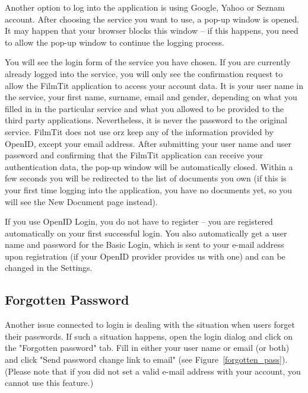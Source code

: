 Another option to log into the application is using Google, Yahoo or Seznam account. After choosing the service you want to use, a pop-up window is opened. It may happen that your browser blocks this window -- if this happens, you need to allow the pop-up window to continue the logging process.

You will see the login form of the service you have chosen. If you are currently already logged into the service, you will only see the confirmation request to allow the FilmTit application to access your account data. It is your user name in the service, your first name, surname, email and gender, depending on what you filled in in the particular service and what you allowed to be provided to the third party applications. Nevertheless, it is never the password to the original service. FilmTit does not use orz keep any of the information provided by OpenID, except your email address.
After submitting your user name and user password and confirming that the FilmTit application can receive your authentication data, the pop-up window will be automatically closed. Within a few seconds you will be redirected to the list of documents you own (if this is your first time logging into the application, you have no documents yet, so you will see the New Document page instead).

If you use OpenID Login, you do not have to register -- you are registered automatically on your first successful login. You also automatically get a user name and password for the Basic Login, which is sent to your e-mail address upon registration (if your OpenID provider provides us with one) and can be changed in the Settings.

\subsection{Forgotten Password}

Another issue connected to login is dealing with the situation when users forget their passwords. If such a situation happens, open the login dialog and click on the "Forgotten password" tab. Fill in either your user name or email (or both) and click "Send password change link to email" (see Figure~\ref{forgotten_pass}). (Please note that if you did not set a valid e-mail address with your account, you cannot use this feature.)

